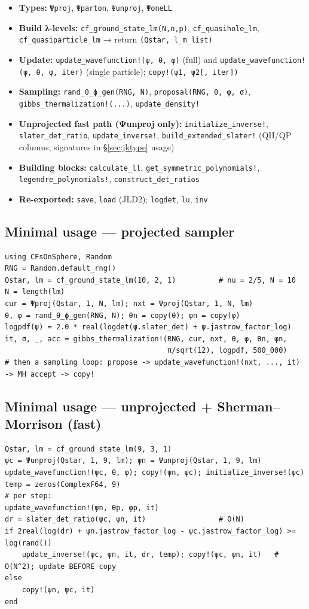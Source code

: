 \documentclass[11pt]{article}
\newcommand{\code}[1]{\texttt{#1}}
\begin{document}
\begin{itemize}
\item \textbf{Types:} \code{Ψproj}, \code{Ψparton}, \code{Ψunproj}, \code{ΨoneLL}
\item \textbf{Build λ-levels:} \code{cf\_ground\_state\_lm(N,n,p)}, \code{cf\_quasihole\_lm},
  \code{cf\_quasiparticle\_lm} → return \code{(Qstar, l\_m\_list)}
\item \textbf{Update:} \code{update\_wavefunction!(ψ, θ, φ)} (full) and
  \code{update\_wavefunction!(ψ, θ, φ, iter)} (single particle); \code{copy!(ψ1, ψ2[, iter])}
\item \textbf{Sampling:} \code{rand\_θ\_ϕ\_gen(RNG, N)}, \code{proposal(RNG, θ, φ, σ)},
  \code{gibbs\_thermalization!(...)}, \code{update\_density!}
\item \textbf{Unprojected fast path (Ψunproj only):} \code{initialize\_inverse!},
  \code{slater\_det\_ratio}, \code{update\_inverse!}, \code{build\_extended\_slater!}
  (QH/QP columns; signatures in §\ref{sec:jktype} usage)
\item \textbf{Building blocks:} \code{calculate\_ll}, \code{get\_symmetric\_polynomials!},
  \code{legendre\_polynomials!}, \code{construct\_det\_ratios}
\item \textbf{Re-exported:} \code{save}, \code{load} (JLD2); \code{logdet}, \code{lu}, \code{inv}
\end{itemize}

\subsection{Minimal usage --- projected sampler}
\begin{Verbatim}[fontsize=\small]
using CFsOnSphere, Random
RNG = Random.default_rng()
Qstar, lm = cf_ground_state_lm(10, 2, 1)          # nu = 2/5, N = 10
N = length(lm)
cur = Ψproj(Qstar, 1, N, lm); nxt = Ψproj(Qstar, 1, N, lm)
θ, φ = rand_θ_ϕ_gen(RNG, N); θn = copy(θ); φn = copy(φ)
logpdf(ψ) = 2.0 * real(logdet(ψ.slater_det) + ψ.jastrow_factor_log)
it, σ, _, acc = gibbs_thermalization!(RNG, cur, nxt, θ, φ, θn, φn,
                                      π/sqrt(12), logpdf, 500_000)
# then a sampling loop: propose -> update_wavefunction!(nxt, ..., it) -> MH accept -> copy!
\end{Verbatim}

\subsection{Minimal usage --- unprojected + Sherman--Morrison (fast)}
\begin{Verbatim}[fontsize=\small]
Qstar, lm = cf_ground_state_lm(9, 3, 1)
ψc = Ψunproj(Qstar, 1, 9, lm); ψn = Ψunproj(Qstar, 1, 9, lm)
update_wavefunction!(ψc, θ, φ); copy!(ψn, ψc); initialize_inverse!(ψc)
temp = zeros(ComplexF64, 9)
# per step:
update_wavefunction!(ψn, θp, φp, it)
dr = slater_det_ratio(ψc, ψn, it)                 # O(N)
if 2real(log(dr) + ψn.jastrow_factor_log - ψc.jastrow_factor_log) >= log(rand())
    update_inverse!(ψc, ψn, it, dr, temp); copy!(ψc, ψn, it)   # O(N^2); update BEFORE copy
else
    copy!(ψn, ψc, it)
end
\end{Verbatim}
\end{document}
